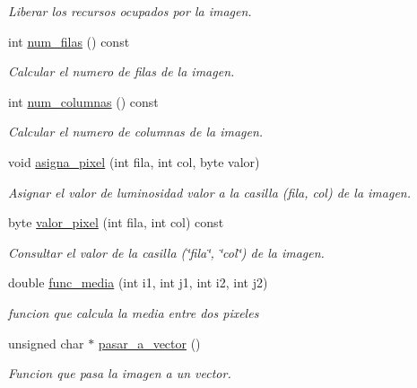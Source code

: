 \begin{DoxyCompactItemize}
\begin{DoxyCompactList}\small\item\em Liberar los recursos ocupados por la imagen. \end{DoxyCompactList}\item 
int \hyperlink{classImagen_a4cb4faa04f5e2913965e43a6a65acfd1}{num\+\_\+filas} () const
\begin{DoxyCompactList}\small\item\em Calcular el numero de filas de la imagen. \end{DoxyCompactList}\item 
int \hyperlink{classImagen_ac28d55c18064aea2a65e6fcf51d86191}{num\+\_\+columnas} () const
\begin{DoxyCompactList}\small\item\em Calcular el numero de columnas de la imagen. \end{DoxyCompactList}\item 
void \hyperlink{classImagen_af9ac39daf075288473967839d9a0d2d8}{asigna\+\_\+pixel} (int fila, int col, byte valor)
\begin{DoxyCompactList}\small\item\em Asignar el valor de luminosidad valor a la casilla (fila, col) de la imagen. \end{DoxyCompactList}\item 
byte \hyperlink{classImagen_a7d9378695a7fd2dce8092f180e716229}{valor\+\_\+pixel} (int fila, int col) const
\begin{DoxyCompactList}\small\item\em Consultar el valor de la casilla (\char`\"{}fila\char`\"{}, \char`\"{}col\char`\"{}) de la imagen. \end{DoxyCompactList}\item 
double \hyperlink{classImagen_a7d47cde7bfc77e2fb8e52cd879f3ef03}{func\+\_\+media} (int i1, int j1, int i2, int j2)
\begin{DoxyCompactList}\small\item\em funcion que calcula la media entre dos pixeles \end{DoxyCompactList}\item 
unsigned char $\ast$ \hyperlink{classImagen_a4ff2179227e9de5b8b735b5d43d3f2b4}{pasar\+\_\+a\+\_\+vector} ()
\begin{DoxyCompactList}\small\item\em Funcion que pasa la imagen a un vector. \end{DoxyCompactList}\end{DoxyCompactItemize}


